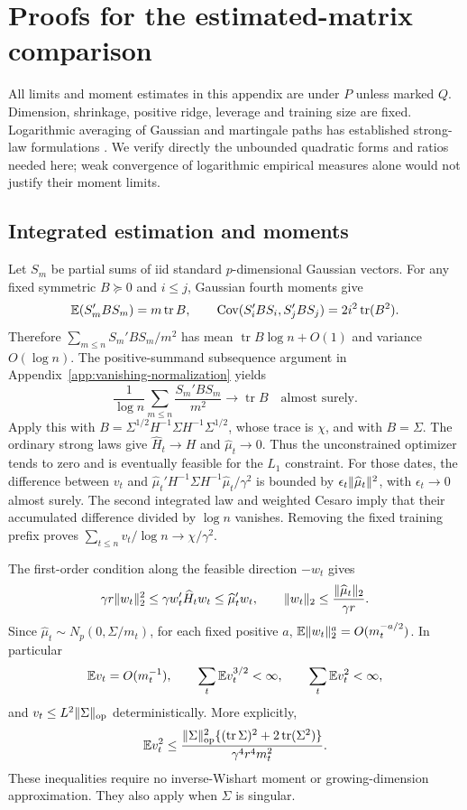 \section{Proofs for the estimated-matrix comparison}
\label{app:multivariate-waiting}
All limits and moment estimates in this appendix are under $P$ unless marked
$Q$. Dimension, shrinkage, positive ridge, leverage and training size are fixed.
Logarithmic averaging of Gaussian and martingale paths has established
strong-law formulations \cite{chaabane}. We verify directly the unbounded
quadratic forms and ratios needed here; weak convergence of logarithmic
empirical measures alone would not justify their moment limits.

\subsection{Integrated estimation and moments}
Let $S_m$ be partial sums of iid standard $p$-dimensional Gaussian vectors.
For any fixed symmetric $B\succeq0$ and $i\le j$, Gaussian fourth moments give
\[
 \mathbb E(S_m'BS_m)=m\operatorname{tr}B,
 \qquad
 \operatorname{Cov}(S_i'BS_i,S_j'BS_j)
       =2i^2\operatorname{tr}(B^2).
\]
Therefore $\sum_{m\le n}S_m'BS_m/m^2$ has mean
$\operatorname{tr}B\log n+O(1)$ and variance $O(\log n)$.
The positive-summand subsequence argument in
Appendix~\ref{app:vanishing-normalization} yields
\[
 \frac1{\log n}\sum_{m\le n}\frac{S_m'BS_m}{m^2}
       \longrightarrow\operatorname{tr}B\quad\text{almost surely}.
\]
Apply this with
$B=\Sigma^{1/2}H^{-1}\Sigma H^{-1}\Sigma^{1/2}$, whose trace is $\chi$,
and with $B=\Sigma$. The ordinary strong laws give
$\widehat H_t\to H$ and $\widehat\mu_t\to0$. Thus the unconstrained
optimizer tends to zero and is eventually feasible for the $L_1$ constraint.
For those dates, the difference between $v_t$ and
$\widehat\mu_t'H^{-1}\Sigma H^{-1}\widehat\mu_t/\gamma^2$ is bounded by
$\epsilon_t\lVert\widehat\mu_t\rVert^2$, with $\epsilon_t\to0$ almost surely.
The second integrated law and weighted Cesaro imply that their accumulated
difference divided by $\log n$ vanishes. Removing the fixed training prefix
proves $\sum_{t\le n}v_t/\log n\to\chi/\gamma^2$.

The first-order condition along the feasible direction $-w_t$ gives
\[
 \gamma r\lVert w_t\rVert_2^2
 \le\gamma w_t'\widehat H_tw_t
 \le\widehat\mu_t'w_t,
 \qquad \lVert w_t\rVert_2\le\frac{\lVert\widehat\mu_t\rVert_2}{\gamma r}.
\]
Since $\widehat\mu_t\sim N_p(0,\Sigma/m_t)$, for each fixed positive $a$,
$\mathbb E\lVert w_t\rVert_2^a=O(m_t^{-a/2})$. In particular
\[
 \mathbb E v_t=O(m_t^{-1}),\qquad
 \sum_t\mathbb E v_t^{3/2}<\infty,\qquad
 \sum_t\mathbb E v_t^2<\infty,
\]
and $v_t\le L^2\lVert\Sigma\rVert_{\mathrm{op}}$ deterministically. More explicitly,
\[
 \mathbb E v_t^2\le
 \frac{\lVert\Sigma\rVert_{\mathrm{op}}^2
       \{(\operatorname{tr}\Sigma)^2+2\operatorname{tr}(\Sigma^2)\}}
      {\gamma^4r^4m_t^2}.
\]
These inequalities require no inverse-Wishart moment or growing-dimension
approximation. They also apply when $\Sigma$ is singular.

